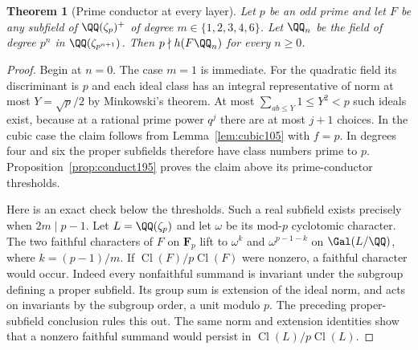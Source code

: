 \documentclass[a4paper,11pt]{article}
\newtheorem{theorem}[proposition]{Theorem}
\theoremstyle{definition}
\theoremstyle{remark}
\numberwithin{equation}{section}
\newcommand{\Cl}{\operatorname{Cl}}
\begin{document}
\begin{theorem}[Prime conductor at every layer]\label{thm:prime195}
Let \(p\) be an odd prime and let \(F\) be any subfield of
\(\QQ(\zeta_p)^+\) of degree \(m\in\{1,2,3,4,6\}\). Let
\(\QQ_n\) be the field of degree \(p^n\) in
\(\QQ(\zeta_{p^{n+1}})\). Then \(p\nmid h(F\QQ_n)\) for every
\(n\ge0\).
\end{theorem}
\begin{proof}
Begin at \(n=0\). The case \(m=1\) is immediate. For the
quadratic field its discriminant is \(p\) and each ideal class
has an integral representative of norm at most \(Y=\sqrt p/2\)
by Minkowski's theorem. At most \(\sum_{ab\le Y}1\le Y^2<p\)
such ideals exist, because at a rational prime power \(q^j\)
there are at most \(j+1\) choices. In the cubic case the claim
follows from Lemma~\ref{lem:cubic105} with \(f=p\). In degrees
four and six the proper subfields therefore have class numbers
prime to \(p\). Proposition~\ref{prop:conduct195} proves the
claim above its prime-conductor thresholds.

Here is an exact check below the thresholds. Such a real
subfield exists precisely when \(2m\mid p-1\).
Let \(L=\QQ(\zeta_p)\) and let \(\omega\) be its mod-\(p\)
cyclotomic character. The two faithful characters of \(F\) on
\(\mathbf F_p\) lift to \(\omega^k\) and \(\omega^{p-1-k}\) on
\(\Gal(L/\QQ)\), where \(k=(p-1)/m\). If \(\Cl(F)/p\Cl(F)\)
were nonzero, a faithful character would occur. Indeed every
nonfaithful summand is invariant under the subgroup defining a
proper subfield. Its group sum is extension of the ideal norm,
and acts on invariants by the subgroup order, a unit modulo \(p\).
The preceding proper-subfield conclusion rules this out.
The same norm and extension identities show that a nonzero
faithful summand would persist in \(\Cl(L)/p\Cl(L)\).


\end{proof}
\end{document}
